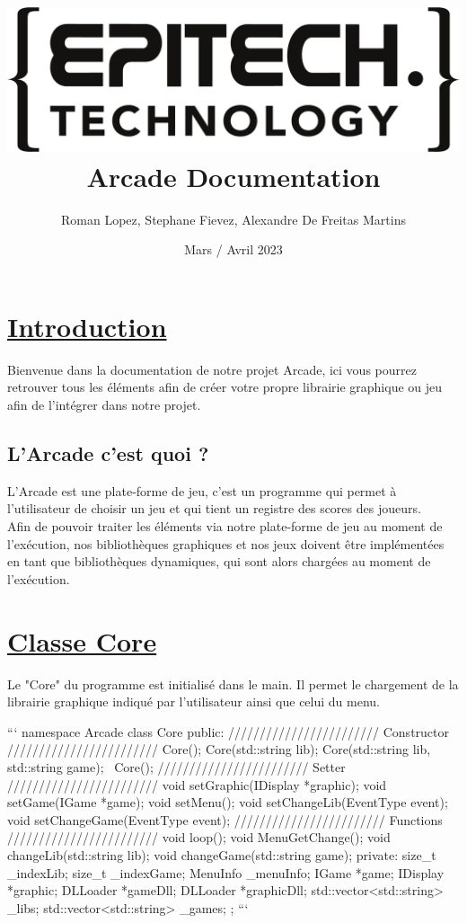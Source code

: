 \documentclass{report}
\title{\includegraphics{epitechLogo.png} \\ \vspace{0.5cm} Arcade Documentation}
\author{Roman Lopez, Stephane Fievez, Alexandre De Freitas Martins}
\date{Mars / Avril 2023}
\begin{document}
\maketitle

\section{\underline{Introduction}}

Bienvenue dans la documentation de notre projet Arcade, ici vous pourrez retrouver tous les éléments afin de créer votre propre librairie graphique ou jeu afin de l'intégrer dans notre projet.

\subsection{L'Arcade c'est quoi ?}

L'Arcade est une plate-forme de jeu, c'est un programme qui permet à l'utilisateur de choisir un jeu et qui tient un registre des scores des joueurs. \\
Afin de pouvoir traiter les éléments via notre plate-forme de jeu au moment de l'exécution, nos bibliothèques graphiques et nos jeux doivent être implémentées en tant que bibliothèques dynamiques, qui sont alors chargées au moment de l'exécution.

\section{\underline{Classe Core}}

Le "Core" du programme est initialisé dans le main. Il permet le chargement de la librairie graphique indiqué par l’utilisateur ainsi que celui du menu.

\begin{tcolorbox}[colback=black!75!white]
{\color{white}
\begin{markdown}
```
namespace Arcade {
    class Core {
        public:
            //////////////////////// Constructor ////////////////////////
            Core();
            Core(std::string lib);
            Core(std::string lib, std::string game);
            ~Core();
            //////////////////////// Setter ////////////////////////
            void setGraphic(IDisplay *graphic);
            void setGame(IGame *game);
            void setMenu();
            void setChangeLib(EventType event);
            void setChangeGame(EventType event);
            //////////////////////// Functions ////////////////////////
            void loop();
            void MenuGetChange();
            void changeLib(std::string lib);
            void changeGame(std::string game);
        private:
            size_t _indexLib;
            size_t _indexGame;
            MenuInfo _menuInfo;
            IGame *game;
            IDisplay *graphic;
            DLLoader *gameDll;
            DLLoader *graphicDll;
            std::vector<std::string> _libs;
            std::vector<std::string> _games;
    };
}
```
\end{markdown}
}
\end{tcolorbox}
\end{document}
